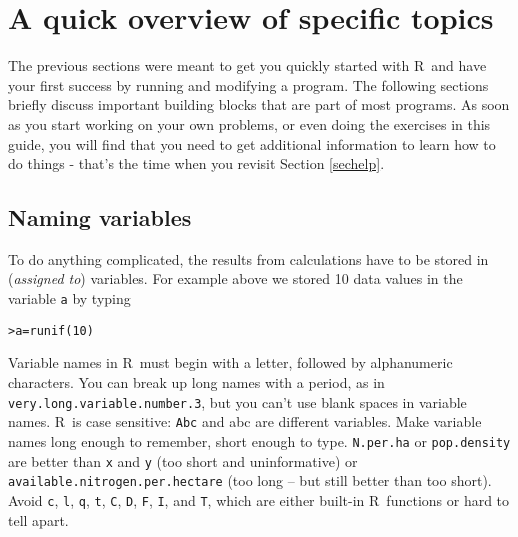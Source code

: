 \documentclass [11pt]{article}
\newcommand{\code}[1]{{\tt #1}}
\newcommand\R{{\sf R}}
\newcounter{exercise}
\numberwithin{exercise}{section}
\begin{document}
\section{A quick overview of specific topics}
The previous sections were meant to get you quickly started with \R\ and have your first success by running and modifying a program. The following sections briefly discuss important building blocks that are part of most programs. As soon as you start working on your own problems, or even doing the exercises in this guide, you will find that you need to get additional information to learn how to do things - that's the time when you revisit Section \ref{sechelp}.


\subsection{Naming variables \label{varnames}}
To do anything complicated, the results from calculations have to be stored in (\emph{assigned to}) variables. 
For example above we stored 10 data values in the variable \code{a} by typing
\vspace{-0.1in}
\begin{verbatim}
>a=runif(10)
\end{verbatim}
\vspace{-0.1in}
Variable names in \R\ must begin with a letter, followed by alphanumeric characters. You can break up long names with a period, as in
\code{very.long.variable.number.3}, but you 
can't use blank spaces in variable names. \R\ is case sensitive: \code{Abc} and \textsf{abc} 
are different variables. Make variable names long enough to remember, short enough to type.
\code{N.per.ha} or \code{pop.density} are better than \code{x}
and \code{y} (too short and uninformative) or \code{available.nitrogen.per.hectare} (too long -- but still better than too short).
Avoid \code{c}, \code{l}, \code{q}, \code{t}, \code{C}, \code{D},
\code{F}, \code{I}, and \code{T}, which are either built-in \R\ functions or
hard to tell apart.

\end{document}
